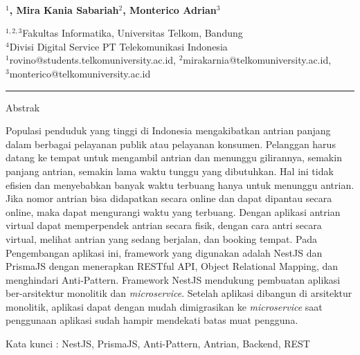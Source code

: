  
  \begin{center}
      \textbf{\large \Title}\\
      \bigskip 
  \end{center}
  
  
  
   \begin{center}
     \bf \Author$^1$, Mira Kania Sabariah$^2$, Monterico Adrian$^3$
  \end{center}
  
  
   \begin{center}
     $^{1,2,3}$Fakultas Informatika, Universitas Telkom, Bandung\\
$^4$Divisi Digital Service PT Telekomunikasi Indonesia\\
$^1$rovino@students.telkomuniversity.ac.id, $^2$mirakarnia@telkomuniversity.ac.id,\\ $^3$monterico@telkomuniversity.ac.id
  \end{center}
  
   
   
{\bf \parindent0pt \noindent\rule{\textwidth}{1pt}}
Abstrak

Populasi penduduk yang tinggi di Indonesia mengakibatkan antrian panjang dalam berbagai pelayanan publik atau pelayanan konsumen. Pelanggan harus datang ke tempat untuk mengambil antrian dan menunggu gilirannya, semakin panjang antrian, semakin lama waktu tunggu yang dibutuhkan. Hal ini tidak efisien dan menyebabkan banyak waktu terbuang hanya untuk menunggu antrian. Jika nomor antrian bisa didapatkan secara online dan dapat dipantau secara online, maka dapat mengurangi waktu yang terbuang. Dengan aplikasi antrian virtual dapat memperpendek antrian secara fisik, dengan cara antri secara virtual, melihat antrian yang sedang berjalan, dan booking tempat. Pada Pengembangan aplikasi ini, framework yang digunakan adalah NestJS dan PrismaJS dengan menerapkan RESTful API, Object Relational Mapping, dan menghindari Anti-Pattern. Framework NestJS mendukung pembuatan aplikasi ber-arsitektur monolitik dan \textit{microservice}. Setelah aplikasi dibangun di arsitektur monolitik, aplikasi dapat dengan mudah dimigrasikan ke \textit{microservice} saat penggunaan aplikasi sudah hampir mendekati batas muat pengguna.

 \bigskip
Kata kunci : NestJS, PrismaJS, Anti-Pattern, Antrian, Backend, REST



